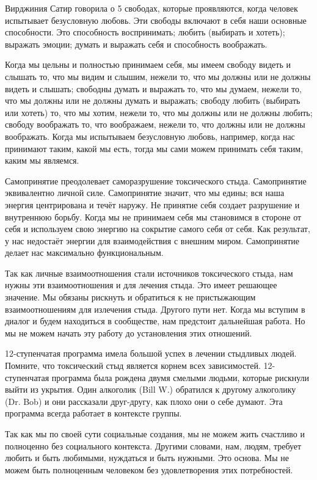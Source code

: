\documentclass[10pt, fleqn]{article}
\begin{document}
Вирджиния Сатир говорила о 5 свободах, которые проявляются, когда человек испытывает безусловную любовь. Эти свободы включают в себя наши основные способности. Это способность воспринимать; любить (выбирать и хотеть); выражать эмоции; думать и выражать себя и способность воображать.

Когда мы цельны и полностью принимаем себя, мы имеем свободу видеть и слышать то, что мы видим и слышим, нежели то, что мы должны или не должны видеть и слышать; свободны думать и выражать то, что мы думаем, нежели то, что мы должны или не должны думать и выражать; свободу любить (выбирать или хотеть) то, что мы хотим, нежели то, что мы должны или не должны любить; свободу воображать то, что воображаем, нежели то, что должны или не должны воображать. Когда мы испытываем безусловную любовь, например, когда нас принимают таким, какой мы есть, тогда мы сами можем принимать себя таким, каким мы являемся.

Самопринятие преодолевает саморазрушение токсического стыда. Самопринятие эквивалентно личной силе. Самопринятие значит, что мы едины; вся наша энергия центрирована и течёт наружу. Не принятие себя создает разрушение и внутреннюю борьбу. Когда мы не принимаем себя мы становимся в стороне от себя и используем свою энергию на сокрытие самого себя от себя. Как результат, у нас недостаёт энергии для взаимодействия с внешним миром. Самопринятие делает нас максимально функциональным.

Так как личные взаимоотношения стали источников токсического стыда, нам нужны эти взаимоотношения и для лечения стыда. Это имеет решающее значение. Мы обязаны рискнуть и обратиться к не пристыжающим взаимоотношениям для излечения стыда. Другого пути нет. Когда мы вступим в диалог и будем находиться в сообществе, нам предстоит дальнейшая работа. Но мы не можем начать эту работу до установления этих отношений.

12-ступенчатая программа имела большой успех в лечении стыдливых людей. Помните, что токсический стыд является корнем всех зависимостей. 12-ступенчатая программа была рождена двумя смелыми людьми, которые рискнули выйти из укрытия. Один алкоголик (Bill W.) обратился к другому алкоголику (Dr. Bob) и они рассказали друг-другу, как плохо они о себе думают. Эта программа всегда работает в контексте группы.

Так как мы по своей сути социальные создания, мы не можем жить счастливо и полноценно без социального контекста. Другими словами, нам, людям, требует любить и быть любимыми, нуждаться и быть нужными. Это основа. Мы не можем быть полноценным человеком без удовлетворения этих потребностей.
\end{document}
